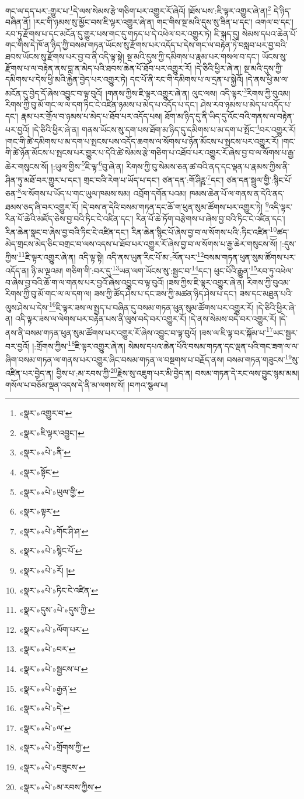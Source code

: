 གང་ལ་དད་པར་:གྱུར་པ་\footnote{«སྣར་»འགྱུར་བ་}དེ་ལས་སེམས་རྩེ་གཅིག་པར་འགྱུར་རོ་ཞེའོ། །ཐོས་པས་:ཇི་ལྟར་འགྱུར་ཞེ་ན།\footnote{«སྣར་»ཇི་ལྟར་འབྱུང་།} དེ་ཉིད་བཞིན་ནོ། །རང་གི་ཉམས་སུ་མྱོང་བས་ཇི་ལྟར་འགྱུར་ཞེ་ན། གང་གིས་སྔ་མའི་དུས་སུ་ཟིན་པ་དང་། འགལ་བ་དང་། རབ་ཏུ་རྫོགས་པ་དང་མངོན་དུ་གྱུར་པས་གང་དུ་གཏད་པ་དེ་འཕེལ་བར་འགྱུར་ཏེ། ཇི་སྐད་དུ། སེམས་དཔའ་ཆེན་པོ་གང་གིས་དེ་ཁོ་ན་ཉིད་ཀྱི་བསམ་གཏན་ཡོངས་སུ་རྫོགས་པར་འདོད་པ་དེས་གང་ལ་བརྟེན་ཏེ་བསླབ་པར་བྱ་བའི་ཐབས་ཡོངས་སུ་རྫོགས་པར་བྱ་བ་ནི་འདི་ལྟ་སྟེ། སྔ་མའི་དུས་ཀྱི་དམིགས་པ་རྣམ་པར་གསལ་བ་དང་། ཡོངས་སུ་རྫོགས་པ་ལ་བརྟེན་ནས་བླ་ན་མེད་པའི་ཐབས་ཆེན་པོ་ཐོབ་པར་འགྱུར་རོ། །དེ་ཅིའི་ཕྱིར་ཞེ་ན། སྔ་མའི་དུས་ཀྱི་དམིགས་པ་དེས་ཕྱི་མའི་རྐྱེན་བྱེད་པར་འགྱུར་ཏེ། དང་པོ་ནི་རང་གི་དམིགས་པ་ལ་དྲན་པ་སྐྱེའོ། །དེ་ནས་ཕྱི་མ་ལ་མངོན་དུ་བྱེད་དོ་ཞེས་འབྱུང་བ་ལྟ་བུའོ། །གནས་ཀྱིས་ཇི་ལྟར་འགྱུར་ཞེ་ན། ལུང་ལས། འདི་ལྟར་\footnote{«སྣར་»«པེ་»ནི་}རིགས་ཀྱི་བུའམ། རིགས་ཀྱི་བུ་མོ་གང་ལ་ལ་དག་ཏིང་ངེ་འཛིན་ཉམས་པ་མེད་པ་འདོད་པ་དང་། ཤེས་རབ་ཉམས་པ་མེད་པ་འདོད་པ་དང་། རྣམ་པར་གྲོལ་བ་ཉམས་པ་མེད་པ་ཐོབ་པར་འདོད་པས། ཐོག་མ་ཉིད་དུ་ནི་ཡིད་དུ་འོང་བའི་གནས་ལ་བརྟེན་པར་བྱའོ། །དེ་ཅིའི་ཕྱིར་ཞེ་ན། གནས་ཡོངས་སུ་དག་པས་ཐོག་མ་ཉིད་དུ་དམིགས་པ་མ་དག་པ་སྤོང་\footnote{«སྣར་»སྟོང་}བར་འགྱུར་རོ། །གང་གི་ཚེ་དམིགས་པ་མ་དག་པ་སྤངས་པས་འདོད་ཆགས་ལ་སོགས་པ་ཉོན་མོངས་པ་སྤངས་པར་འགྱུར་རོ། །གང་གི་ཚེ་ཉོན་མོངས་པ་སྤངས་པར་གྱུར་པ་དེའི་ཚེ་སེམས་རྩེ་གཅིག་པ་འཐོབ་པར་འགྱུར་རོ་ཞེས་བྱ་བ་ལ་སོགས་པ་རྒྱ་ཆེར་གསུངས་སོ། །:ཡུལ་གྱིས་\footnote{«སྣར་»«པེ་»ཡུལ་གྱི་}ཇི་ལྟ་\footnote{«སྣར་»ལྟར་}བུ་ཞེ་ན། རིགས་ཀྱི་བུ་སེམས་ཅན་ཚ་བའི་ནད་དང་ལྡན་པ་རྣམས་ཀྱིས་ནི་ཤིན་ཏུ་མཐོ་བར་གྱུར་པ་དང་། གྲང་བའི་རེག་པ་ཡོད་པ་དང་། ཙན་དན་:གོ་ཤིཪྵ་\footnote{«སྣར་»«པེ་»གོང་ཤི་ཤ་}དང་། ཙན་དན་སྦྲུལ་གྱི་:སྙིང་པོ་ཅན་\footnote{«སྣར་»«པེ་»སྙིང་པོ་}ལ་སོགས་པ་ཡོད་པ་གང་ཡུལ་ཁམས་སམ། འབྲོག་དགོན་པའམ། ཁམས་ཆེན་པོ་ལ་གནས་ན་དེའི་ནད་ཐམས་ཅད་ཞི་བར་འགྱུར་རོ། །དེ་བས་ན་དེའི་བསམ་གཏན་དང་ཆོ་ག་ཕུན་སུམ་ཚོགས་པར་འགྱུར་ཏེ། \footnote{«སྣར་»«པེ་»རོ། ། }འདི་ལྟར་རིན་པོ་ཆེའི་མཛོད་ཅེས་བྱ་བའི་ཏིང་ངེ་འཛིན་དང་། རིན་པོ་ཆེ་ཏོག་བརྩེགས་པ་ཞེས་བྱ་བའི་ཏིང་ངེ་འཛིན་དང་། རིན་ཆེན་སྣང་བ་ཞེས་བྱ་བའི་ཏིང་ངེ་འཛིན་དང་། རིན་ཆེན་སྙིང་པོ་ཞེས་བྱ་བ་ལ་སོགས་པའི་:ཏིང་འཛིན་\footnote{«སྣར་»«པེ་»ཏིང་ངེ་འཛིན་}ཚད་མེད་གྲངས་མེད་ཅིང་བགྲང་བ་ལས་འདས་པ་ཐོབ་པར་འགྱུར་རོ་ཞེས་བྱ་བ་ལ་སོགས་པ་རྒྱ་ཆེར་གསུངས་སོ། །:དུས་ཀྱིས་\footnote{«སྣར་»དུས་«པེ་»དུས་ཀྱི་}ཇི་ལྟར་འགྱུར་ཞེ་ན། འདི་ལྟ་སྟེ། འདི་ནས་ཡུན་རིང་པོ་མ་:ལོན་པར་\footnote{«སྣར་»«པེ་»ལོག་པར་}བསམ་གཏན་ཕུན་སུམ་ཚོགས་པར་འདོད་ན། ཉི་མ་ལྔའམ། གཅིག་གི་:བར་དུ་\footnote{«སྣར་»«པེ་»བར་}ཡན་ལག་ཡོངས་སུ་:སྦྱང་བ་\footnote{«སྣར་»«པེ་»སྦྱངས་པ་}དང་། ཕུང་པོའི་རྒྱུན་\footnote{«སྣར་»«པེ་»རྒྱན་}རབ་ཏུ་འཕེལ་བ་ཞེས་བྱ་བའི་ཆོ་ག་ལ་གནས་པར་བྱའོ་ཞེས་འབྱུང་བ་ལྟ་བུའོ། །ཟས་ཀྱིས་ཇི་ལྟར་འགྱུར་ཞེ་ན། རིགས་ཀྱི་བུའམ་རིགས་ཀྱི་བུ་མོ་གང་ལ་ལ་དག་ལ། ཟས་ཀྱི་ཚོད་ཤེས་པ་དང་ཟས་ཀྱི་མཚན་ཉིད་ཤེས་པ་དང་། ཟས་དང་མཐུན་པའི་ལུས་ཤེས་པ་དེས་\footnote{«སྣར་»«པེ་»དེ་}ཇི་ལྟར་ཟས་ལ་སྤྱད་པ་བཞིན་དུ་བསམ་གཏན་ཕུན་སུམ་ཚོགས་པར་འགྱུར་རོ། །དེ་ཅིའི་ཕྱིར་ཞེ་ན། འདི་ལྟར་ཟས་ལ་ལེགས་པར་བརྟེན་པས་ནི་ལུས་བདེ་བར་འགྱུར་རོ། །དེ་ནས་སེམས་བདེ་བར་འགྱུར་རོ། །དེ་ནས་ནི་བསམ་གཏན་ཕུན་སུམ་ཚོགས་པར་འགྱུར་རོ་ཞེས་འབྱུང་བ་ལྟ་བུའོ། །ཟས་ལ་ཇི་ལྟ་བར་སྐོམ་པ་\footnote{«སྣར་»«པེ་»ལ་}ཡང་སྦྱར་བར་བྱའོ། །:གྲོགས་ཀྱིས་\footnote{«སྣར་»«པེ་»གྲོགས་ཀྱི་}ཇི་ལྟར་འགྱུར་ཞེ་ན། སེམས་དཔའ་ཆེན་པོའི་བསམ་གཏན་དང་ལྡན་པའི་གང་ཟག་ལ་ལ་ཞིག་བསམ་གཏན་ལ་གནས་པར་འགྱུར་ཞིང་བསམ་གཏན་ལ་བསྔགས་པ་བརྗོད་ནས། བསམ་གཏན་གཟུངས་\footnote{«སྣར་»«པེ་»བཟུངས་}སུ་འཛིན་པར་བྱེད་ན། བྱིས་པ་:མ་རབས་ཀྱི་\footnote{«སྣར་»«པེ་»མ་རབས་ཀྱིས་}རྗེས་སུ་འཇུག་པར་མི་བྱེད་ན། བསམ་གཏན་དེ་རང་ལས་བྱུང་སྙམ་མམ། གསོལ་པ་བཅོམ་ལྡན་འདས་དེ་ནི་མ་ལགས་སོ། །བཀའ་སྩལ་པ། 